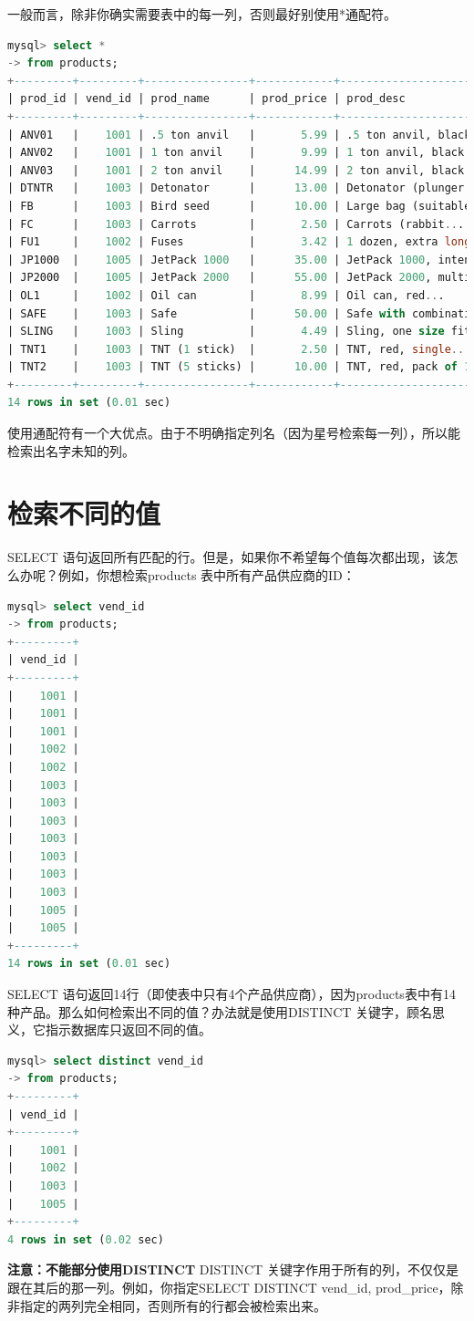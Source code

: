 \documentclass[11pt,a4paper,oneside]{book}
\begin{document}
一般而言，除非你确实需要表中的每一列，否则最好别使用*通配符。
\begin{lstlisting}[language=sql]
mysql> select *
-> from products;
+---------+---------+----------------+------------+----------------------------------------
| prod_id | vend_id | prod_name      | prod_price | prod_desc 
+---------+---------+----------------+------------+----------------------------------------
| ANV01   |    1001 | .5 ton anvil   |       5.99 | .5 ton anvil, black...
| ANV02   |    1001 | 1 ton anvil    |       9.99 | 1 ton anvil, black...
| ANV03   |    1001 | 2 ton anvil    |      14.99 | 2 ton anvil, black...
| DTNTR   |    1003 | Detonator      |      13.00 | Detonator (plunger ...
| FB      |    1003 | Bird seed      |      10.00 | Large bag (suitable ...
| FC      |    1003 | Carrots        |       2.50 | Carrots (rabbit...
| FU1     |    1002 | Fuses          |       3.42 | 1 dozen, extra long...
| JP1000  |    1005 | JetPack 1000   |      35.00 | JetPack 1000, intended...
| JP2000  |    1005 | JetPack 2000   |      55.00 | JetPack 2000, multi-use...
| OL1     |    1002 | Oil can        |       8.99 | Oil can, red...
| SAFE    |    1003 | Safe           |      50.00 | Safe with combination...
| SLING   |    1003 | Sling          |       4.49 | Sling, one size fits...
| TNT1    |    1003 | TNT (1 stick)  |       2.50 | TNT, red, single...
| TNT2    |    1003 | TNT (5 sticks) |      10.00 | TNT, red, pack of 10...
+---------+---------+----------------+------------+----------------------------------------
14 rows in set (0.01 sec)
\end{lstlisting}
使用通配符有一个大优点。由于不明确指定列名（因为星号检索每一列），所以能检索出名字未知的列。

\section{检索不同的值}
SELECT 语句返回所有匹配的行。但是，如果你不希望每个值每次都出现，该怎么办呢？例如，你想检索products 表中所有产品供应商的ID：
\begin{lstlisting}[language=sql]
mysql> select vend_id
-> from products;
+---------+
| vend_id |
+---------+
|    1001 |
|    1001 |
|    1001 |
|    1002 |
|    1002 |
|    1003 |
|    1003 |
|    1003 |
|    1003 |
|    1003 |
|    1003 |
|    1003 |
|    1005 |
|    1005 |
+---------+
14 rows in set (0.01 sec)
\end{lstlisting}
SELECT 语句返回14行（即使表中只有4个产品供应商），因为products表中有14种产品。那么如何检索出不同的值？办法就是使用DISTINCT 关键字，顾名思义，它指示数据库只返回不同的值。
\begin{lstlisting}[language=sql]
mysql> select distinct vend_id
-> from products;
+---------+
| vend_id |
+---------+
|    1001 |
|    1002 |
|    1003 |
|    1005 |
+---------+
4 rows in set (0.02 sec)
\end{lstlisting}
\begin{tcolorbox}[colback=pink!10!white,colframe=pink!100!black]
\textbf{注意：不能部分使用DISTINCT}
DISTINCT 关键字作用于所有的列，不仅仅是跟在其后的那一列。例如，你指定SELECT DISTINCT vend\_id, prod\_price，除非指定的两列完全相同，否则所有的行都会被检索出来。
\end{tcolorbox}
\end{document}
